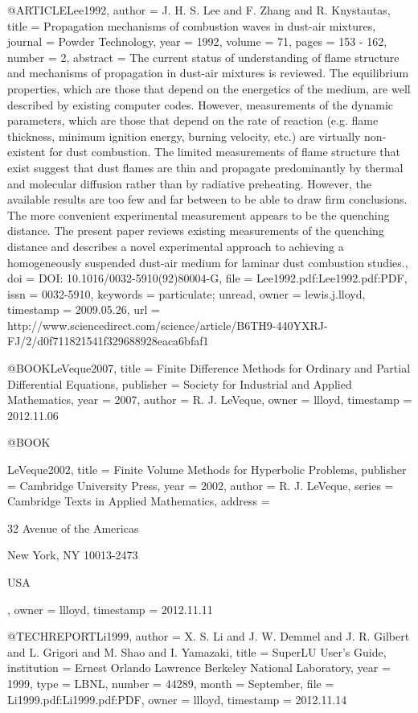{@ARTICLE{Lee1992,
  author = {J. H. S. Lee and F. Zhang and R. Knystautas},
  title = {Propagation mechanisms of combustion waves in dust-air mixtures},
  journal = {Powder Technology},
  year = {1992},
  volume = {71},
  pages = {153 - 162},
  number = {2},
  abstract = {The current status of understanding of flame structure and mechanisms
	of propagation in dust-air mixtures is reviewed. The equilibrium
	properties, which are those that depend on the energetics of the
	medium, are well described by existing computer codes. However, measurements
	of the dynamic parameters, which are those that depend on the rate
	of reaction (e.g. flame thickness, minimum ignition energy, burning
	velocity, etc.) are virtually non-existent for dust combustion. The
	limited measurements of flame structure that exist suggest that dust
	flames are thin and propagate predominantly by thermal and molecular
	diffusion rather than by radiative preheating. However, the available
	results are too few and far between to be able to draw firm conclusions.
	The more convenient experimental measurement appears to be the quenching
	distance. The present paper reviews existing measurements of the
	quenching distance and describes a novel experimental approach to
	achieving a homogeneously suspended dust-air medium for laminar dust
	combustion studies.},
  doi = {DOI: 10.1016/0032-5910(92)80004-G},
  file = {Lee1992.pdf:Lee1992.pdf:PDF},
  issn = {0032-5910},
  keywords = {particulate; unread},
  owner = {lewis.j.lloyd},
  timestamp = {2009.05.26},
  url = {http://www.sciencedirect.com/science/article/B6TH9-440YXRJ-FJ/2/d0f711821541f329688928eaca6bfaf1}
}

@BOOK{LeVeque2007,
  title = {Finite Difference Methods for Ordinary and Partial Differential Equations},
  publisher = {Society for Industrial and Applied Mathematics},
  year = {2007},
  author = {R. J. LeVeque},
  owner = {llloyd},
  timestamp = {2012.11.06}
}

@BOOK{LeVeque2002,
  title = {Finite Volume Methods for Hyperbolic Problems},
  publisher = {Cambridge University Press},
  year = {2002},
  author = {R. J. LeVeque},
  series = {Cambridge Texts in Applied Mathematics},
  address = {32 Avenue of the Americas
	
	New York, NY 10013-2473
	
	USA},
  owner = {llloyd},
  timestamp = {2012.11.11}
}

@TECHREPORT{Li1999,
  author = {X. S. Li and J. W. Demmel and J. R. Gilbert and L. Grigori and M.
	Shao and I. Yamazaki},
  title = {{SuperLU} User's Guide},
  institution = {Ernest Orlando Lawrence Berkeley National Laboratory},
  year = {1999},
  type = {LBNL},
  number = {44289},
  month = {September},
  file = {Li1999.pdf:Li1999.pdf:PDF},
  owner = {llloyd},
  timestamp = {2012.11.14}
}

}
